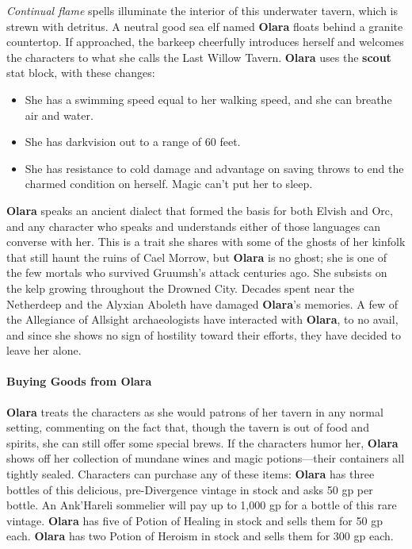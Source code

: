 \documentclass[10pt,a4,twoside,twocolumn,openany,nodeprecatedcode]{dndbook}
\begin{document}
\textit{Continual flame} spells illuminate the interior of this underwater tavern, which is strewn with detritus. A neutral good sea elf named \textbf{Olara} floats behind a granite countertop. If approached, the barkeep cheerfully introduces herself and welcomes the characters to what she calls the Last Willow Tavern. \textbf{Olara} uses the \textbf{scout} stat block, with these changes:
\begin{itemize}

\item She has a swimming speed equal to her walking speed, and she can breathe air and water.
\item She has darkvision out to a range of 60 feet.
\item She has resistance to cold damage and advantage on saving throws to end the charmed condition on herself. Magic can't put her to sleep.
\end{itemize}


\textbf{Olara} speaks an ancient dialect that formed the basis for both Elvish and Orc, and any character who speaks and understands either of those languages can converse with her. This is a trait she shares with some of the ghosts of her kinfolk that still haunt the ruins of Cael Morrow, but \textbf{Olara} is no ghost; she is one of the few mortals who survived Gruumsh's attack centuries ago. She subsists on the kelp growing throughout the Drowned City.
Decades spent near the Netherdeep and the Alyxian Aboleth have damaged \textbf{Olara}'s memories. A few of the Allegiance of Allsight archaeologists have interacted with \textbf{Olara}, to no avail, and since she shows no sign of hostility toward their efforts, they have decided to leave her alone.
\paragraph{Buying Goods from Olara}
\textbf{Olara} treats the characters as she would patrons of her tavern in any normal setting, commenting on the fact that, though the tavern is out of food and spirits, she can still offer some special brews. If the characters humor her, \textbf{Olara} shows off her collection of mundane wines and magic potions—their containers all tightly sealed. Characters can purchase any of these items:
{{\textbf{Olara} has three bottles of this delicious, pre-Divergence vintage in stock and asks 50 gp per bottle. An Ank'Hareli sommelier will pay up to 1,000 gp for a bottle of this rare vintage.}}
{{\textbf{Olara} has five of Potion of Healing in stock and sells them for 50 gp each.}}
{{\textbf{Olara} has two Potion of Heroism in stock and sells them for 300 gp each.}}
\end{document}
